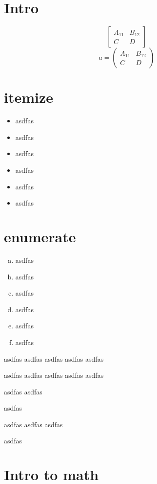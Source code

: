 
\section{Intro}
$$
\begin{bmatrix}
A_{11}&B_{12}\\
C&D
\end{bmatrix}
$$
$$
a=\begin{pmatrix}
A_{11}&B_{12}\\
C&D
\end{pmatrix}
$$

\section{itemize}

\begin{itemize}
\item asdfas
\item asdfas
\item asdfas
\item asdfas
\item asdfas
\item asdfas
\end{itemize}


\section{enumerate}
\begin{enumerate}[a)]%
\item asdfas
\item asdfas
\item asdfas
\item asdfas
\item asdfas
\item asdfas
\end{enumerate}

\begin{description}
\item[Force] asdfas asdfas asdfas asdfas asdfas 
\item[$\alpha$] asdfas asdfas asdfas asdfas asdfas
\item asdfas asdfas
\item asdfas
\item asdfas asdfas asdfas
\item asdfas
\end{description}


\section{Intro to math}


